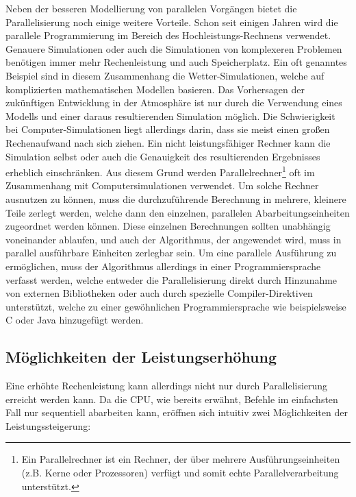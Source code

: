 		Neben der besseren Modellierung von parallelen Vorgängen bietet die Parallelisierung noch einige weitere Vorteile. Schon seit einigen Jahren wird die parallele Programmierung im Bereich des Hochleistungs-Rechnens verwendet. Genauere Simulationen oder auch die Simulationen von komplexeren Problemen benötigen immer mehr Rechenleistung und auch Speicherplatz. Ein oft genanntes Beispiel sind in diesem Zusammenhang die Wetter-Simulationen, welche auf komplizierten mathematischen Modellen basieren. Das Vorhersagen der zukünftigen Entwicklung in der Atmosphäre ist nur durch die Verwendung eines Modells und einer daraus resultierenden Simulation möglich.
		Die Schwierigkeit bei Computer-Simulationen liegt allerdings darin, dass sie meist einen großen Rechenaufwand nach sich ziehen. Ein nicht leistungsfähiger Rechner kann die Simulation selbst oder auch die Genauigkeit des resultierenden Ergebnisses erheblich einschränken. Aus diesem Grund werden Parallelrechner\footnote{Ein Parallelrechner ist ein Rechner, der über mehrere Ausführungseinheiten (z.B. Kerne oder Prozessoren) verfügt und somit echte Parallelverarbeitung unterstützt.} oft im Zusammenhang mit Computersimulationen verwendet. Um solche Rechner ausnutzen zu können, muss die durchzuführende Berechnung in mehrere, kleinere Teile zerlegt werden, welche dann den einzelnen, parallelen Abarbeitungseinheiten zugeordnet werden können. Diese einzelnen Berechnungen sollten unabhängig voneinander ablaufen, und auch der Algorithmus, der angewendet wird, muss in parallel ausführbare Einheiten zerlegbar sein. Um eine parallele Ausführung zu ermöglichen, muss der Algorithmus allerdings in einer Programmiersprache verfasst werden, welche entweder die Parallelisierung direkt durch Hinzunahme von externen Bibliotheken oder auch durch spezielle Compiler-Direktiven unterstützt, welche zu einer gewöhnlichen Programmiersprache wie beispielsweise C oder Java hinzugefügt werden. \cite{ParaProgRauber}\\
		
		\subsection{Möglichkeiten der Leistungserhöhung}
			\label{MoeglichkeitenLeistungserhoehung}
		
			Eine erhöhte Rechenleistung kann allerdings nicht nur durch Parallelisierung erreicht werden kann. Da die CPU, wie bereits erwähnt, Befehle im einfachsten Fall nur sequentiell abarbeiten kann, eröffnen sich intuitiv zwei Möglichkeiten der Leistungssteigerung:
		
